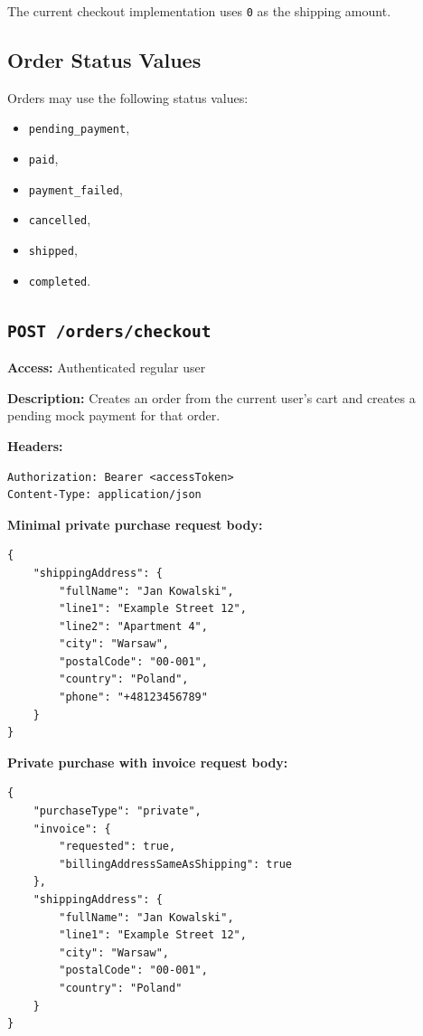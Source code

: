 The current checkout implementation uses \texttt{0} as the shipping amount.

\subsection{Order Status Values}

Orders may use the following status values:

\begin{itemize}
    \item \texttt{pending\_payment},
    \item \texttt{paid},
    \item \texttt{payment\_failed},
    \item \texttt{cancelled},
    \item \texttt{shipped},
    \item \texttt{completed}.
\end{itemize}

\subsection{\texttt{POST /orders/checkout}}

\textbf{Access:} Authenticated regular user

\textbf{Description:} Creates an order from the current user's cart and creates a pending mock payment for that order.

\textbf{Headers:}

\begin{verbatim}
Authorization: Bearer <accessToken>
Content-Type: application/json
\end{verbatim}

\pagebreak
\textbf{Minimal private purchase request body:}

\begin{verbatim}
{
    "shippingAddress": {
        "fullName": "Jan Kowalski",
        "line1": "Example Street 12",
        "line2": "Apartment 4",
        "city": "Warsaw",
        "postalCode": "00-001",
        "country": "Poland",
        "phone": "+48123456789"
    }
}
\end{verbatim}

\textbf{Private purchase with invoice request body:}

\begin{verbatim}
{
    "purchaseType": "private",
    "invoice": {
        "requested": true,
        "billingAddressSameAsShipping": true
    },
    "shippingAddress": {
        "fullName": "Jan Kowalski",
        "line1": "Example Street 12",
        "city": "Warsaw",
        "postalCode": "00-001",
        "country": "Poland"
    }
}
\end{verbatim}

